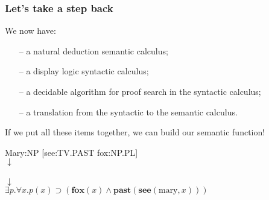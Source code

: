 \documentclass[12pt,t]{beamer}
\begin{document}
\begin{frame}
  \frametitle{Let's take a step back}
  We now have:
  \vfill
  \begin{itemize}
  \item[--] a natural deduction semantic calculus;
  \item[--] a display logic syntactic calculus;
  \item[--] a decidable algorithm for proof search in the syntactic
    calculus;
  \item[--] a translation from the syntactic to the semantic calculus.
  \end{itemize}
  \vfill
  If we put all these items together, we can build our semantic
  function!
  \begin{center}
    Mary:NP [see:TV.PAST fox:NP.PL]
    \\
    $\downarrow$
    \\
    \\
    $\downarrow$
    \\
    $\exists p.\forall x.p(x) \supset (\mathbf{fox}(x) \land
    \mathbf{past}(\mathbf{see}(\text{mary},x)))$
  \end{center}
\end{frame}

\end{document}
